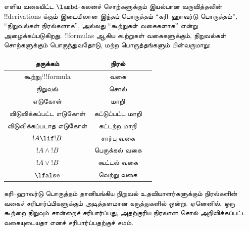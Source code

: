\documentclass[../../../include/open-logic-section]{subfiles}
\begin{document}
எளிய வகையிட்ட $\lambd$-கலனச் சொற்களுக்கும் இயல்பான
வருவித்தலின் !!{derivation}s க்கும் இடையிலான இந்தப்
பொருத்தம் ``கரி--ஹாவர்டு பொருத்தம்'',
``நிறுவல்கள் நிரல்களாக'', அல்லது ``கூற்றுகள் வகைகளாக''
என்று அழைக்கப்படுகிறது. !!{formula}s ஆகிய கூற்றுகள்
வகைகளுக்கும், நிறுவல்கள் சொற்களுக்கும் பொருந்துவதோடு,
மற்ற பொருத்தங்களும் பின்வருமாறு:
\begin{center}
  \begin{tabular}{c c c}
    தருக்கம் & நிரல் \\
    \hline
    கூற்று/!!{formula} & வகை \\
    நிறுவல் & சொல் \\
    எடுகோள் & மாறி \\
    விடுவிக்கப்பட்ட எடுகோள் & கட்டுப்பட்ட மாறி \\
    விடுவிக்கப்படாத எடுகோள் & கட்டற்ற மாறி \\
    $!A \lif !B$ & சார்பு வகை \\
    $!A \land !B$ & பெருக்கல் வகை \\
    $!A \lor !B$ & கூட்டல் வகை \\
    $\lfalse$ & வெற்று வகை \\
    \hline
  \end{tabular}
\end{center}

கரி--ஹாவர்டு பொருத்தம் தானியங்கிய நிறுவல்
உதவியாளர்களுக்கும் நிரல்களின் வகைச் சரிபார்ப்பிகளுக்கும்
அடித்தளமான கருத்துகளில் ஒன்று. ஏனெனில், ஒரு கூற்றை
நிறுவும் சான்றைச் சரிபார்ப்பது, அதற்குரிய நிரலான சொல்
அறிவிக்கப்பட்ட வகையுடையதா எனச் சரிபார்ப்பதற்குச் சமம்.
\end{document}
